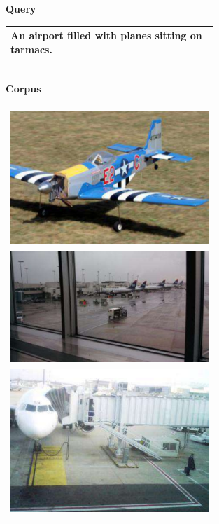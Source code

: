 \begin{figure}[h]
\centering
\textbf{Query}

\begin{tabular}{|p{0.7\linewidth}|}
\hline
An airport filled with planes sitting on tarmacs. \\ 
\hline
\end{tabular}
\\
\textbf{Corpus}
\\
\begin{tabular}{|>{\centering\arraybackslash} p{0.7\linewidth}|}
\hline
\\
\includegraphics[width=0.9\linewidth,frame]{figures/examples_assests/retrieval/corpus_1.pdf} \\
\includegraphics[width=0.9\linewidth,frame]{figures/examples_assests/retrieval/answer.pdf} \\
\includegraphics[width=0.9\linewidth,frame]{figures/examples_assests/retrieval/corpus_2.pdf} \\

\end{tabular}
\end{figure}
